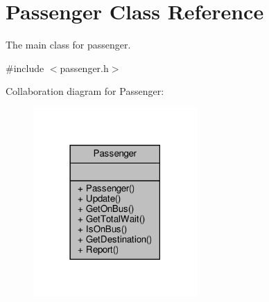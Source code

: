 \hypertarget{classPassenger}{}\section{Passenger Class Reference}
\label{classPassenger}


The main class for passenger.  




{\ttfamily \#include $<$passenger.\+h$>$}



Collaboration diagram for Passenger\+:\nopagebreak
\begin{figure}[H]
\begin{center}
\leavevmode
\includegraphics[width=177pt]{classPassenger__coll__graph}
\end{center}
\end{figure}
